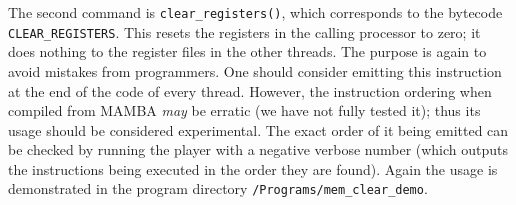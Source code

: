 The second command is \verb+clear_registers()+, which corresponds to the
bytecode \verb+CLEAR_REGISTERS+.
This resets the registers in the calling processor to zero; it does nothing
to the register files in the other threads.
The purpose is again to avoid mistakes from programmers. One should consider
emitting this instruction at the end of the code of every thread.
However, the instruction ordering when compiled from MAMBA {\em may} be
erratic (we have not fully tested it); thus its usage should be considered
experimental.
The exact order of it being emitted can be checked by running the player
with a negative verbose number (which outputs the instructions being executed
in the order they are found).
Again the usage is demonstrated in the program  directory \verb+/Programs/mem_clear_demo+.

